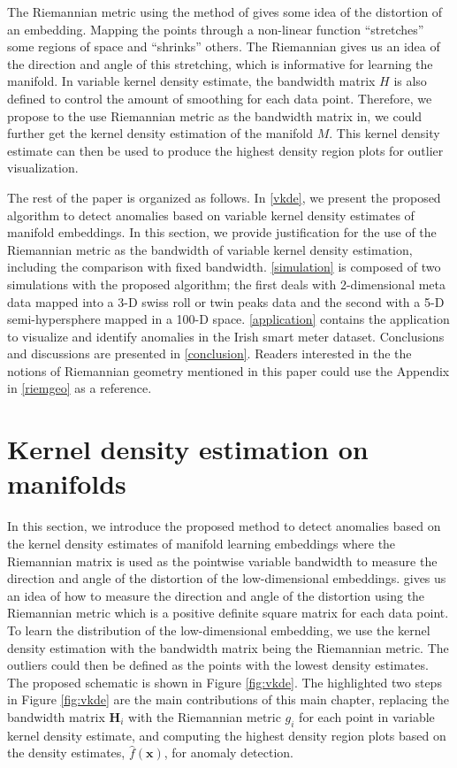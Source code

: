 \documentclass[11pt,a4paper,]{article}
\begin{document}
The Riemannian metric using the method of \textcite{Perrault-Joncas2013-pq} gives some idea of the distortion of an embedding. Mapping the points through a non-linear function ``stretches'' some regions of space and ``shrinks'' others. The Riemannian gives us an idea of the direction and angle of this stretching, which is informative for learning the manifold.
In variable kernel density estimate, the bandwidth matrix \(H\) is also defined to control the amount of smoothing for each data point.
Therefore, we propose to the use Riemannian metric as the bandwidth matrix in, we could further get the kernel density estimation of the manifold \(M\). This kernel density estimate can then be used to produce the highest density region plots \autocite{Hyndman1996-lk} for outlier visualization.

The rest of the paper is organized as follows.
In \autoref{vkde}, we present the proposed algorithm to detect anomalies based on variable kernel density estimates of manifold embeddings. In this section, we provide justification for the use of the Riemannian metric as the bandwidth of variable kernel density estimation, including the comparison with fixed bandwidth.
\autoref{simulation} is composed of two simulations with the proposed algorithm; the first deals with 2-dimensional meta data mapped into a 3-D swiss roll or twin peaks data and the second with a 5-D semi-hypersphere mapped in a 100-D space.
\autoref{application} contains the application to visualize and identify anomalies in the Irish smart meter dataset.
Conclusions and discussions are presented in \autoref{conclusion}.
Readers interested in the the notions of Riemannian geometry mentioned in this paper could use the Appendix in \autoref{riemgeo} as a reference.

\hypertarget{vkde}{%
\section{Kernel density estimation on manifolds}\label{vkde}}

In this section, we introduce the proposed method to detect anomalies based on the kernel density estimates of manifold learning embeddings where the Riemannian matrix is used as the pointwise variable bandwidth to measure the direction and angle of the distortion of the low-dimensional embeddings. \textcite{Perrault-Joncas2013-pq} gives us an idea of how to measure the direction and angle of the distortion using the Riemannian metric which is a positive definite square matrix for each data point. To learn the distribution of the low-dimensional embedding, we use the kernel density estimation with the bandwidth matrix being the Riemannian metric. The outliers could then be defined as the points with the lowest density estimates. The proposed schematic is shown in Figure \ref{fig:vkde}. The highlighted two steps in Figure \ref{fig:vkde} are the main contributions of this main chapter, replacing the bandwidth matrix \(\pmb{H}_i\) with the Riemannian metric \(g_i\) for each point in variable kernel density estimate, and computing the highest density region plots based on the density estimates, \(\hat{f}(\pmb{x})\), for anomaly detection.
\end{document}
